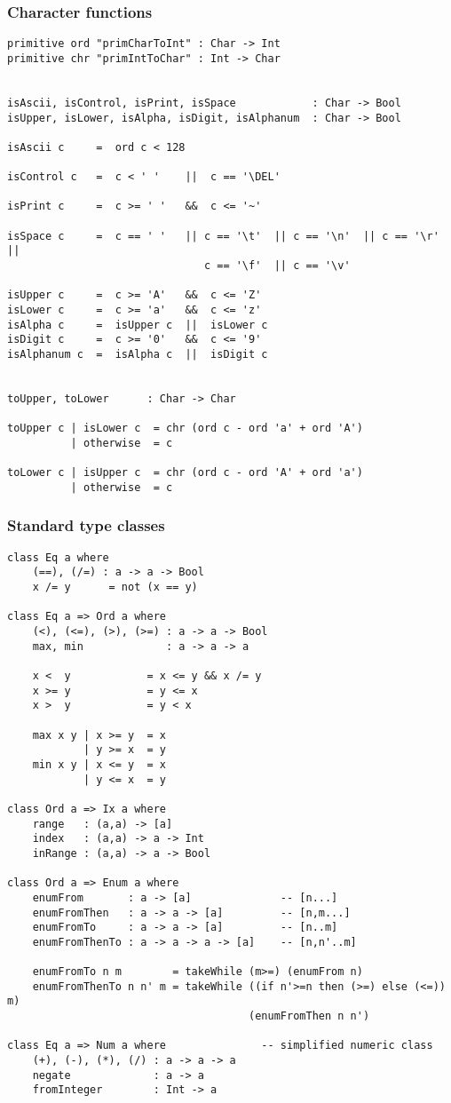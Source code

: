 \subsubsection*{Character functions}
\begin{verbatim}
primitive ord "primCharToInt" : Char -> Int
primitive chr "primIntToChar" : Int -> Char


isAscii, isControl, isPrint, isSpace            : Char -> Bool
isUpper, isLower, isAlpha, isDigit, isAlphanum  : Char -> Bool

isAscii c     =  ord c < 128

isControl c   =  c < ' '    ||  c == '\DEL'

isPrint c     =  c >= ' '   &&  c <= '~'

isSpace c     =  c == ' '   || c == '\t'  || c == '\n'  || c == '\r'  ||
                               c == '\f'  || c == '\v'

isUpper c     =  c >= 'A'   &&  c <= 'Z'
isLower c     =  c >= 'a'   &&  c <= 'z'
isAlpha c     =  isUpper c  ||  isLower c
isDigit c     =  c >= '0'   &&  c <= '9'
isAlphanum c  =  isAlpha c  ||  isDigit c


toUpper, toLower      : Char -> Char

toUpper c | isLower c  = chr (ord c - ord 'a' + ord 'A')
          | otherwise  = c

toLower c | isUpper c  = chr (ord c - ord 'A' + ord 'a')
          | otherwise  = c
\end{verbatim}
\subsubsection*{Standard type classes}
\begin{verbatim}
class Eq a where
    (==), (/=) : a -> a -> Bool
    x /= y      = not (x == y)

class Eq a => Ord a where
    (<), (<=), (>), (>=) : a -> a -> Bool
    max, min             : a -> a -> a

    x <  y            = x <= y && x /= y
    x >= y            = y <= x
    x >  y            = y < x

    max x y | x >= y  = x
            | y >= x  = y
    min x y | x <= y  = x
            | y <= x  = y

class Ord a => Ix a where
    range   : (a,a) -> [a]
    index   : (a,a) -> a -> Int
    inRange : (a,a) -> a -> Bool

class Ord a => Enum a where
    enumFrom       : a -> [a]              -- [n...]
    enumFromThen   : a -> a -> [a]         -- [n,m...]
    enumFromTo     : a -> a -> [a]         -- [n..m]
    enumFromThenTo : a -> a -> a -> [a]    -- [n,n'..m]

    enumFromTo n m        = takeWhile (m>=) (enumFrom n)
    enumFromThenTo n n' m = takeWhile ((if n'>=n then (>=) else (<=)) m)
                                      (enumFromThen n n')

class Eq a => Num a where               -- simplified numeric class
    (+), (-), (*), (/) : a -> a -> a
    negate             : a -> a
    fromInteger	       : Int -> a
\end{verbatim}
